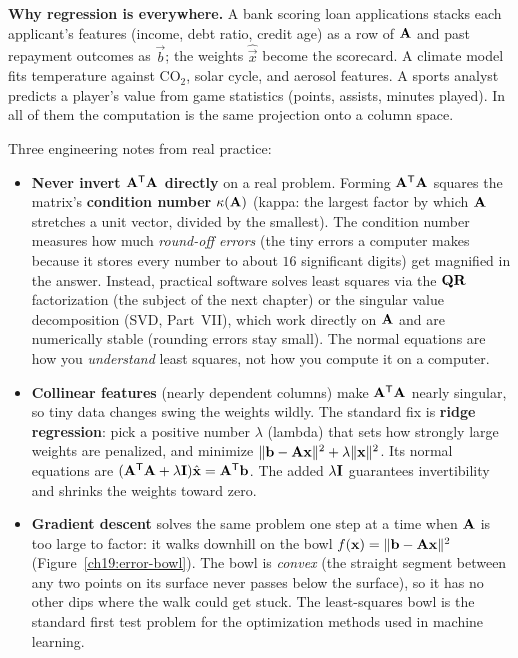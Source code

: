 \begin{applicationbox}
\textbf{Why regression is everywhere.} A bank scoring loan applications stacks each applicant's
features (income, debt ratio, credit age) as a row of $\mathbf{A}$ and past repayment outcomes as
$\vec{b}$; the weights $\hat{\vec{x}}$ become the scorecard. A climate model fits temperature
against $\mathrm{CO}_2$, solar cycle, and aerosol features. A sports analyst predicts a player's
value from game statistics (points, assists, minutes played). In all of them the computation is the
same projection onto a column space.

Three engineering notes from real practice:
\begin{itemize}
  \item \textbf{Never invert $\mathbf{A}^{\mathsf{T}}\mathbf{A}$ directly} on a real problem. Forming
  $\mathbf{A}^{\mathsf{T}}\mathbf{A}$ squares the matrix's \textbf{condition number} $\kappa(\mathbf{A})$ (kappa: the
  largest factor by which $\mathbf{A}$ stretches a unit vector, divided by the smallest). The
  condition number measures how much \emph{round-off errors} (the tiny errors a computer makes
  because it stores every number to about $16$ significant digits) get magnified in the answer.
  Instead, practical software solves least squares via the
  $\mathbf{Q}\mathbf{R}$ factorization (the subject of the next chapter) or the singular value
  decomposition (SVD, Part~VII), which work directly on $\mathbf{A}$ and are numerically stable
  (rounding errors stay small). The normal equations are how you \emph{understand} least
  squares, not how you compute it on a computer.
  \item \textbf{Collinear features} (nearly dependent columns) make $\mathbf{A}^{\mathsf{T}}\mathbf{A}$ nearly
  singular, so tiny data changes swing the weights wildly. The standard fix is \textbf{ridge
  regression}: pick a positive number $\lambda$ (lambda) that sets how strongly large weights are
  penalized, and minimize $\lVert\mathbf{b}-\mathbf{A}\mathbf{x}\rVert^2 + \lambda\lVert\mathbf{x}\rVert^2$. Its normal
  equations are $(\mathbf{A}^{\mathsf{T}}\mathbf{A}+\lambda\mathbf{I})\hat{\mathbf{x}}=\mathbf{A}^{\mathsf{T}}\mathbf{b}$. The added
  $\lambda\mathbf{I}$ guarantees invertibility and shrinks the weights toward zero.
  \item \textbf{Gradient descent} solves the same problem one step at a time when $\mathbf{A}$ is
  too large to factor: it walks downhill on the bowl $f(\mathbf{x})=\lVert\mathbf{b}-\mathbf{A}\mathbf{x}\rVert^2$
  (Figure~\ref{ch19:error-bowl}). The bowl is \emph{convex} (the straight segment between any two
  points on its surface never passes below the surface), so it has no other dips where the walk
  could get stuck. The least-squares bowl is the standard first test problem for the optimization
  methods used in machine learning.
\end{itemize}
\end{applicationbox}


